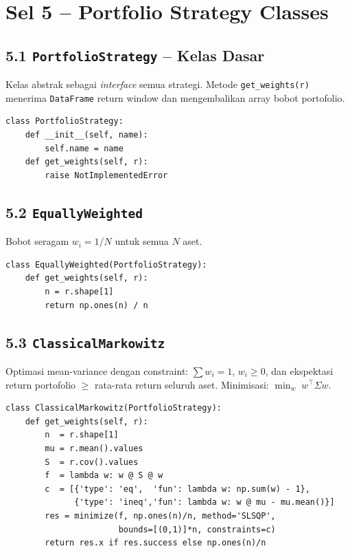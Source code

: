 \documentclass[12pt,a4paper]{article}
\begin{document}
\section{Sel 5 -- Portfolio Strategy Classes}

\subsection{5.1 \texttt{PortfolioStrategy} -- Kelas Dasar}
Kelas abstrak sebagai \textit{interface} semua strategi. Metode \texttt{get\_weights(r)}
menerima \texttt{DataFrame} return window dan mengembalikan array bobot portofolio.

\begin{lstlisting}[caption={Kelas dasar PortfolioStrategy}]
class PortfolioStrategy:
    def __init__(self, name):
        self.name = name
    def get_weights(self, r):
        raise NotImplementedError
\end{lstlisting}

\subsection{5.2 \texttt{EquallyWeighted}}
Bobot seragam $w_i = 1/N$ untuk semua $N$ aset.

\begin{lstlisting}[caption={EquallyWeighted}]
class EquallyWeighted(PortfolioStrategy):
    def get_weights(self, r):
        n = r.shape[1]
        return np.ones(n) / n
\end{lstlisting}

\subsection{5.3 \texttt{ClassicalMarkowitz}}
Optimasi mean-variance dengan constraint: $\sum w_i = 1$, $w_i \geq 0$,
dan ekspektasi return portofolio $\geq$ rata-rata return seluruh aset.
Minimisasi: $\min_w \; w^\top \Sigma w$.

\begin{lstlisting}[caption={ClassicalMarkowitz}]
class ClassicalMarkowitz(PortfolioStrategy):
    def get_weights(self, r):
        n  = r.shape[1]
        mu = r.mean().values
        S  = r.cov().values
        f  = lambda w: w @ S @ w
        c  = [{'type': 'eq',  'fun': lambda w: np.sum(w) - 1},
              {'type': 'ineq','fun': lambda w: w @ mu - mu.mean()}]
        res = minimize(f, np.ones(n)/n, method='SLSQP',
                       bounds=[(0,1)]*n, constraints=c)
        return res.x if res.success else np.ones(n)/n
\end{lstlisting}
\end{document}
